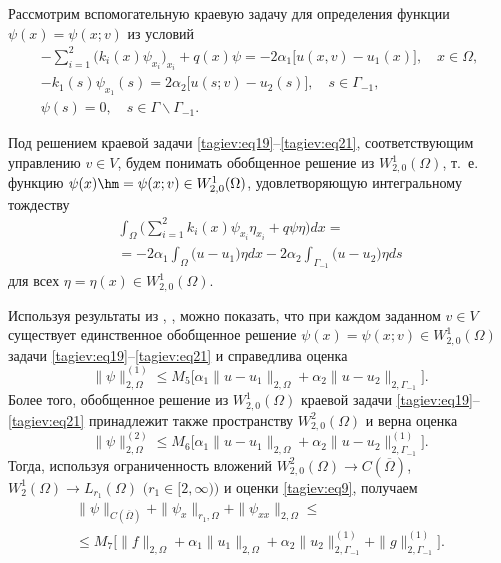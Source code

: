 \smallskip

 Рассмотрим вспомогательную краевую задачу для определения 
функции $\psi ( x )=\psi ( x; v  )$ из условий
\begin{gather}
\label{tagiev:eq19}
-\sum\limits_{i=1}^2  \big(k_i ( x )\psi _{x_i } \big)_{x_i } +q ( x )\psi =-2\alpha _1 \big [u (x, v )-u_1 ( x ) \big], \quad x \in \Omega,\\
\label{tagiev:eq21}
-k_1 ( s )\psi _{x_1 } ( s )=2\alpha _2 \big[u (s; v  )-u_2 ( s ) \big], \quad s \in \Gamma_{-1},\\
\label{tagiev:eq21}
\psi ( s )=0,\quad s\in \Gamma \backslash \Gamma _{-1}.
\end{gather}

Под решением краевой задачи \eqref{tagiev:eq19}--\eqref{tagiev:eq21}, соответствующим управлению $ v  
\in V$, будем понимать обобщенное решение из $W_{2,0}^1 ( \Omega)$, т.~е. функцию $\psi ( x )\hm =\psi ( x; v ) \in W_{2,0}^1 ( \Omega )$, удовлетворяющую интегральному 
тождеству
\begin{multline}
\label{tagiev:eq22}
\int _\Omega \biggl(\sum\limits_{i=1}^2 k_i ( x )\psi 
_{x_i } \eta _{x_i } +q\psi \eta \biggr)dx=
\\
=
-2\alpha_1 
\int _\Omega \big(u-u_1\big)\eta dx-2\alpha _2 
\int _{\Gamma _{-1} }  \big(u-u_2 \big)\eta ds
\end{multline}
для всех $\eta =\eta ( x )\in W_{2,0}^1 ( \Omega )$. 

Используя результаты из \cite[с.~112--116]{tagiev:bib15}, \cite[с.~40--46]{tagiev:bib16}, можно показать, 
что при каждом заданном $ v  \in V$ существует единственное обобщенное 
решение $\psi ( x )=\psi (x; v ) \in W_{2,0}^1 ( \Omega )$ задачи \eqref{tagiev:eq19}--\eqref{tagiev:eq21} и справедлива оценка 
\begin{equation}
\label{tagiev:eq23}
 \| \psi \|_{2,\Omega }^{ ( 1 )} \le M_5 
 \bigl[\alpha _1 \| u-u_1 \|_{2,\Omega } +\alpha _2 \| u-u_2 \|_{2,\Gamma _{-1}} \bigr].
\end{equation}
Более того, обобщенное решение из $W_{2,0}^1 ( \Omega )$ краевой 
задачи \eqref{tagiev:eq19}--\eqref{tagiev:eq21} принадлежит также пространству $W_{2,0}^2 ( \Omega 
 )$ и верна оценка \cite[с.~125--134]{tagiev:bib15} 
\[
 \| \psi \|_{2,\Omega}^{ ( 2 )} \le 
 M_6 \bigl[\alpha _1 \| u-u_1  \|_{2,\Omega } +\alpha _2 \| u-u_2 \|_{2,\Gamma _{-1} }^{ ( 1 )} \bigr].
\]
Тогда, используя ограниченность вложений $W_{2,0}^2 ( \Omega   ) \to C (\overline \Omega )$, 
$W_2^1 ( \Omega   )\to L_{r_1 } ( \Omega )$ $\bigl(r_1 \in [2,\infty) \bigr)$ \cite[с.~84]{tagiev:bib15} и оценки \eqref{tagiev:eq9}, получаем 
\begin{multline}
\label{tagiev:eq24}
 \| \psi \|_{C (\overline \Omega )} + \| \psi _x \|_{r_1 ,\Omega } + \| \psi _{xx} \|_{2,\Omega} 
\le \\
\le M_7 \bigl[ \| f \|_{2,\Omega } +\alpha _1 \| u_1  \|_{2,\Omega } +\alpha _2 \| u_2  \|_{2,\Gamma _{-1}}^{ ( 1 )} +
 \| g \|_{2,\Gamma _{-1}}^{( 1 )} \bigr].
\end{multline}

